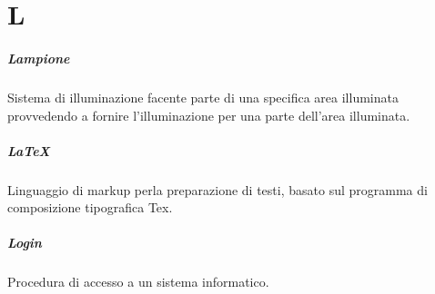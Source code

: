 \chapter{L}

\paragraph*{Lampione}
Sistema di illuminazione facente parte di una specifica area illuminata provvedendo a fornire l'illuminazione per una parte dell'area illuminata.

\paragraph*{\LaTeX}
Linguaggio di markup perla preparazione di testi, basato sul programma di composizione tipografica Tex.

\paragraph*{Login}
Procedura di accesso a un sistema informatico.